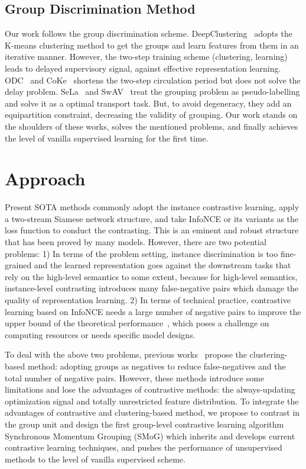 \documentclass[runningheads]{style/llncs}
\begin{document}
\subsection{Group Discrimination Method}
Our work follows the group discrimination scheme. DeepClustering~\cite{deepcluster} adopts the K-means clustering method to get the groups and learn features from them in an iterative manner. However, the two-step training scheme (clustering, learning) leads to delayed supervisory signal, against effective representation learning. ODC~\cite{ODC} and CoKe~\cite{coke} shortens the two-step circulation period but does not solve the delay problem. SeLa~\cite{sela} and SwAV~\cite{swav} treat the grouping problem as pseudo-labelling and solve it as a optimal transport task. But, to avoid degeneracy, they add an equipartition constraint, decreasing the validity of grouping. Our work stands on the shoulders of these works, solves the mentioned problems, and finally achieves the level of vanilla supervised learning for the first time.

\section{Approach}
Present SOTA methods commonly adopt the instance contrastive learning, apply a two-stream Siamese network structure, and take InfoNCE or its variants as the loss function to conduct the contrasting. This is an eminent and robust structure that has been proved by many models. However, there are two potential problems: 1) In terms of the problem setting, instance discrimination is too fine-grained and the learned representation goes against the downstream tasks that rely on the high-level semantics to some extent, because for high-level semantics, instance-level contrasting introduces many false-negative pairs which damage the quality of representation learning. 2) In terms of technical practice, contrastive learning based on InfoNCE needs a large number of negative pairs to improve the upper bound of the theoretical performance~\cite{simclr,moco}, which poses a challenge on computing resources or needs specific model designs. 

To deal with the above two problems, previous works~\cite{swav,deepcluster,cld} propose the clustering-based method: adopting groups as negatives to reduce false-negatives and the total number of negative pairs. However, these methods introduce some limitations and lose the advantages of contrastive methods: the always-updating optimization signal and totally unrestricted feature distribution. To integrate the advantages of contrastive and clustering-based method, we propose to contrast in the group unit and design the first group-level contrastive learning algorithm Synchronous Momentum Grouping (SMoG) which inherits and develops current contrastive learning techniques, and pushes the performance of unsupervised methods to the level of vanilla supervised scheme.
\end{document}
